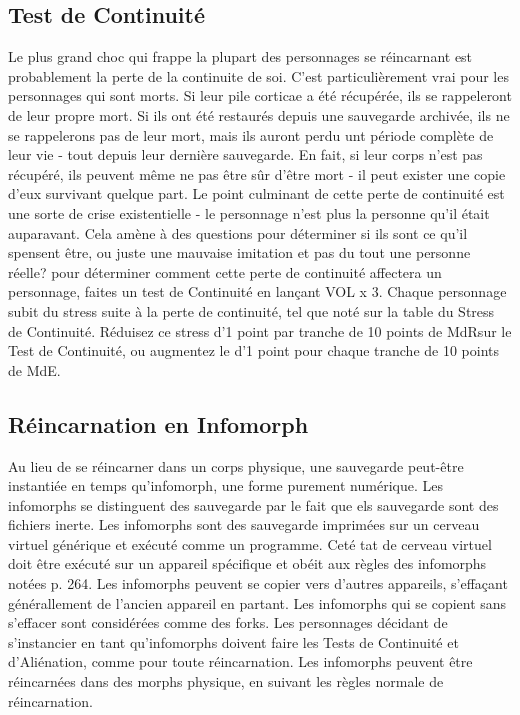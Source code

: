 \subsection{Test de Continuité} 

Le plus grand choc qui frappe la plupart des personnages se réincarnant est probablement la perte de la continuite de soi. C'est particulièrement vrai pour les personnages qui sont morts. Si leur pile corticae a été récupérée, ils se rappeleront de leur propre mort. Si ils ont été restaurés depuis une sauvegarde archivée, ils ne se rappelerons pas de leur mort, mais ils auront perdu unt période complète de leur vie - tout depuis leur dernière sauvegarde. En fait, si leur corps n'est pas récupéré, ils peuvent même ne pas être sûr d'être mort - il peut exister une copie d'eux survivant quelque part. Le point culminant de cette perte de continuité est une sorte de crise existentielle - le personnage n'est plus la personne qu'il était auparavant. Cela amène à des questions pour déterminer si ils sont ce qu'il spensent être, ou juste une mauvaise imitation et pas du tout une personne réelle? pour déterminer comment cette perte de continuité affectera un personnage, faites un test de Continuité en lançant VOL x 3. Chaque personnage subit du stress suite à la perte de continuité, tel que noté sur la table du Stress de Continuité. Réduisez ce stress d'1 point par tranche de 10 points de MdRsur le Test de Continuité, ou augmentez le d'1 point pour chaque tranche de 10 points de MdE. 

\subsection{Réincarnation en Infomorph} 

Au lieu de se réincarner dans un corps physique, une sauvegarde peut-être instantiée en temps qu'infomorph, une forme purement numérique. Les infomorphs se distinguent des sauvegarde par le fait que els sauvegarde sont des fichiers inerte. Les infomorphs sont des sauvegarde imprimées sur un cerveau virtuel générique et exécuté comme un programme. Ceté tat de cerveau virtuel doit être exécuté sur un appareil spécifique et obéit aux règles des infomorphs notées p. 264. Les infomorphs peuvent se copier vers d'autres appareils, s'effaçant générallement de l'ancien appareil en partant. Les infomorphs qui se copient sans s'effacer sont considérées comme des forks. Les personnages décidant de s'instancier en tant qu'infomorphs doivent faire les Tests de Continuité et d'Aliénation, comme pour toute réincarnation. Les infomorphs peuvent être réincarnées dans des morphs physique, en suivant les règles normale de réincarnation. 

